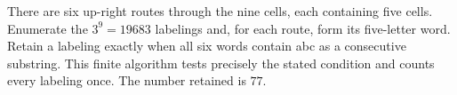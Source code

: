 There are six up-right routes through the nine cells, each containing five cells. Enumerate the $3^9=19683$ labelings and, for each route, form its five-letter word. Retain a labeling exactly when all six words contain abc as a consecutive substring. This finite algorithm tests precisely the stated condition and counts every labeling once. The number retained is $\boxed{77}$.
